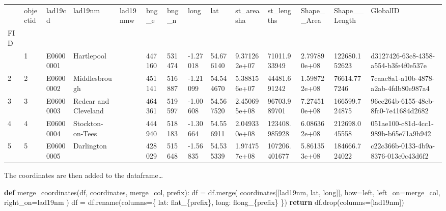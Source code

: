 \documentclass[
  number]{elsarticle}
\newenvironment{Shaded}{\begin{snugshade}}{\end{snugshade}}
\newcommand{\ControlFlowTok}[1]{\textcolor[rgb]{0.00,0.23,0.31}{\textbf{#1}}}
\newcommand{\KeywordTok}[1]{\textcolor[rgb]{0.00,0.23,0.31}{\textbf{#1}}}
\newcommand{\NormalTok}[1]{\textcolor[rgb]{0.00,0.23,0.31}{#1}}
\newcommand{\OperatorTok}[1]{\textcolor[rgb]{0.37,0.37,0.37}{#1}}
\newcommand{\SpecialCharTok}[1]{\textcolor[rgb]{0.37,0.37,0.37}{#1}}
\newcommand{\SpecialStringTok}[1]{\textcolor[rgb]{0.13,0.47,0.30}{#1}}
\newcommand{\StringTok}[1]{\textcolor[rgb]{0.13,0.47,0.30}{#1}}
\begin{document}
\begin{longtable}[]{@{}llllllllllllll@{}}
\toprule\noalign{}
& objectid & lad19cd & lad19nm & lad19nmw & bng\_e & bng\_n & long & lat
& st\_areasha & st\_lengths & Shape\_\_Area & Shape\_\_Length &
GlobalID \\
FID & & & & & & & & & & & & & \\
\midrule\noalign{}
\endhead
\bottomrule\noalign{}
\endlastfoot
1 & 1 & E06000001 & Hartlepool & & 447160 & 531474 & -1.27018 &
54.676140 & 9.371262e+07 & 71011.933949 & 2.797890e+08 & 122680.152623 &
d3127426-63c8-4358-a554-b3fe4f0e537e \\
2 & 2 & E06000002 & Middlesbrough & & 451141 & 516887 & -1.21099 &
54.544670 & 5.388156e+07 & 44481.691242 & 1.598722e+08 & 76614.777246 &
7caac8a1-a10b-4878-a2ab-4fdb80e987a4 \\
3 & 3 & E06000003 & Redcar and Cleveland & & 464361 & 519597 & -1.00608
& 54.567520 & 2.450695e+08 & 96703.989701 & 7.274510e+08 & 166599.724875
& 96cc264b-6155-48cb-8fc0-7e41684d2682 \\
4 & 4 & E06000004 & Stockton-on-Tees & & 444940 & 518183 & -1.30664 &
54.556911 & 2.049330e+08 & 123408.985928 & 6.086362e+08 & 212698.045558
& 051ae100-c81d-4cc1-989b-b65e71a9b942 \\
5 & 5 & E06000005 & Darlington & & 428029 & 515648 & -1.56835 &
54.535339 & 1.974757e+08 & 107206.401677 & 5.861353e+08 & 184666.724022
& c22c366b-0133-4b9a-8376-013e0c43d6f2 \\
\end{longtable}

The coordinates are then added to the dataframe\ldots{}

\begin{Shaded}
\begin{Highlighting}[]
\KeywordTok{def}\NormalTok{ merge\_coordinates(df, coordinates, merge\_col, prefix):}
\NormalTok{    df }\OperatorTok{=}\NormalTok{ df.merge(}
\NormalTok{        coordinates[[}\StringTok{\textquotesingle{}lad19nm\textquotesingle{}}\NormalTok{, }\StringTok{\textquotesingle{}lat\textquotesingle{}}\NormalTok{, }\StringTok{\textquotesingle{}long\textquotesingle{}}\NormalTok{]],}
\NormalTok{        how}\OperatorTok{=}\StringTok{\textquotesingle{}left\textquotesingle{}}\NormalTok{,}
\NormalTok{        left\_on}\OperatorTok{=}\NormalTok{merge\_col,}
\NormalTok{        right\_on}\OperatorTok{=}\StringTok{\textquotesingle{}lad19nm\textquotesingle{}}
\NormalTok{    )}
\NormalTok{    df }\OperatorTok{=}\NormalTok{ df.rename(columns}\OperatorTok{=}\NormalTok{\{}
        \StringTok{\textquotesingle{}lat\textquotesingle{}}\NormalTok{: }\SpecialStringTok{f\textquotesingle{}lat\_}\SpecialCharTok{\{}\NormalTok{prefix}\SpecialCharTok{\}}\SpecialStringTok{\textquotesingle{}}\NormalTok{,}
        \StringTok{\textquotesingle{}long\textquotesingle{}}\NormalTok{: }\SpecialStringTok{f\textquotesingle{}long\_}\SpecialCharTok{\{}\NormalTok{prefix}\SpecialCharTok{\}}\SpecialStringTok{\textquotesingle{}}
\NormalTok{    \})}
    \ControlFlowTok{return}\NormalTok{ df.drop(columns}\OperatorTok{=}\NormalTok{[}\StringTok{\textquotesingle{}lad19nm\textquotesingle{}}\NormalTok{])}
\end{Highlighting}
\end{Shaded}
\end{document}
